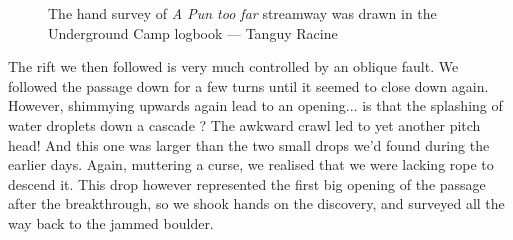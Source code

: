 \begin{figure}[t!]
\checkoddpage \ifoddpage \forcerectofloat \else \forceversofloat \fi
\centering
{}
\caption{The hand survey of \emph{A Pun too far} streamway was drawn in the Underground Camp logbook --- Tanguy Racine}
\label{Notebook pun too far}
\end{figure}

The rift we then followed is very much controlled by an oblique fault. We followed the passage down for a few turns until it seemed to close down again. However, shimmying upwards again lead to an opening... is that the splashing of water droplets down a cascade ? The awkward crawl led to yet another pitch head!
And this one was larger than the two small drops we'd found during the earlier days. Again, muttering a curse, we realised that we were lacking rope to descend it. This drop however represented the first big opening of the passage after the breakthrough, so we shook hands on the discovery, and surveyed all the way back to the jammed boulder.

